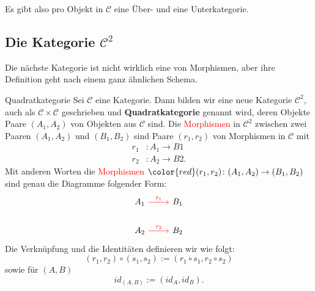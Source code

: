 \documentclass[a4paper]{amsart}
\theoremstyle{definition}
\begin{document}
Es gibt also pro Objekt in $\mathcal C$ eine Über- und eine Unterkategorie.

\subsection{Die Kategorie $\mathcal C^2$}
Die nächste Kategorie ist nicht wirklich eine von Morphismen, aber ihre Definition geht nach einem ganz ähnlichen Schema.

\begin{Definition}{Quadratkategorie}
   Sei $\mathcal C$ eine Kategorie. Dann bilden wir eine neue Kategorie $\mathcal C^2$, auch als $\mathcal C \times \mathcal C$ geschrieben und \textbf{Quadratkategorie} genannt wird, deren Objekte Paare $(A_1, A_2)$ von Objekten aus $\mathcal{C}$ sind.
   Die \textcolor{red}{Morphismen} in $\mathcal C^2$ zwischen zwei Paaren $(A_1, A_2)$ und $(B_1, B_2)$ sind Paare $(r_1, r_2)$ von Morphismen in $\mathcal C$ mit
   \begin{align*}
      r_1 &\colon A_1 \to B1 \\
      r_2 &\colon A_2 \to B2.
   \end{align*}
   Mit anderen Worten die \textcolor{red}{Morphismen} 
   $\color{red}(r_1, r_2 ) \colon (A_1, A_2 ) \to (B_1, B_2 )$
   sind genau die Diagramme folgender Form:
   \begin{equation*}
      \begin{tikzcd}
         A_1   \arrow[r, red, "r_1"] & B_1 \\
         A_2   \arrow[r, red, "r_2"] & B_2
      \end{tikzcd}
   \end{equation*}
   Die Verknüpfung und die Identitäten definieren wir wie folgt:
   \begin{equation*}
      (r_1, r_2)\circ (s_1, s_2) := (r_1 \circ s_1, r_2 \circ s_2 )
   \end{equation*}
   sowie für $(A , B)$
   \begin{equation*}
      id_{(A, B)} := ( id_A, id_B ).
   \end{equation*}
\end{Definition}

\end{document}
